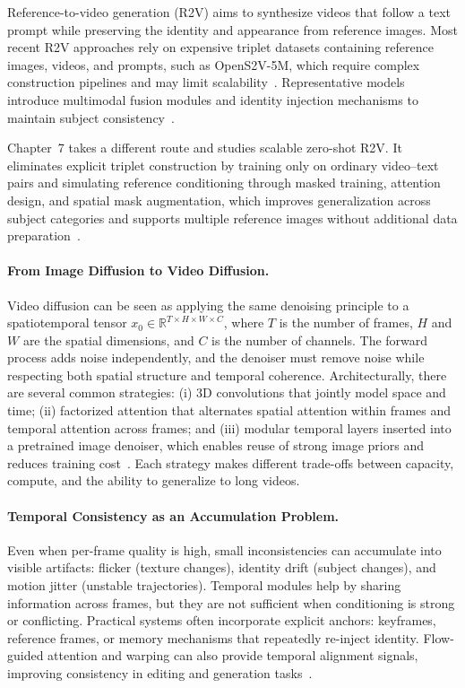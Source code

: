 Reference-to-video generation (R2V) aims to synthesize videos that follow a text prompt while preserving the identity and appearance from reference images. Most recent R2V approaches rely on expensive triplet datasets containing reference images, videos, and prompts, such as OpenS2V-5M, which require complex construction pipelines and may limit scalability~\citep{yuan2025opens2v, liu2025phantom}. Representative models introduce multimodal fusion modules and identity injection mechanisms to maintain subject consistency~\citep{liu2025phantom, jiang2025vace, hu2025polyvivid, li2025bindweave}.

Chapter~7 takes a different route and studies scalable zero-shot R2V. It eliminates explicit triplet construction by training only on ordinary video--text pairs and simulating reference conditioning through masked training, attention design, and spatial mask augmentation, which improves generalization across subject categories and supports multiple reference images without additional data preparation~\citep{zhou2025scaling}.

\paragraph{From Image Diffusion to Video Diffusion.}
Video diffusion can be seen as applying the same denoising principle to a spatiotemporal tensor $x_0\in\mathbb{R}^{T\times H\times W\times C}$, where $T$ is the number of frames, $H$ and $W$ are the spatial dimensions, and $C$ is the number of channels. The forward process adds noise independently, and the denoiser must remove noise while respecting both spatial structure and temporal coherence. Architecturally, there are several common strategies: (i) 3D convolutions that jointly model space and time; (ii) factorized attention that alternates spatial attention within frames and temporal attention across frames; and (iii) modular temporal layers inserted into a pretrained image denoiser, which enables reuse of strong image priors and reduces training cost~\citep{guo2023animatediff, blattmann2023stable}. Each strategy makes different trade-offs between capacity, compute, and the ability to generalize to long videos.

\paragraph{Temporal Consistency as an Accumulation Problem.}
Even when per-frame quality is high, small inconsistencies can accumulate into visible artifacts: flicker (texture changes), identity drift (subject changes), and motion jitter (unstable trajectories). Temporal modules help by sharing information across frames, but they are not sufficient when conditioning is strong or conflicting. Practical systems often incorporate explicit anchors: keyframes, reference frames, or memory mechanisms that repeatedly re-inject identity. Flow-guided attention and warping can also provide temporal alignment signals, improving consistency in editing and generation tasks~\citep{cong2023flatten}.

